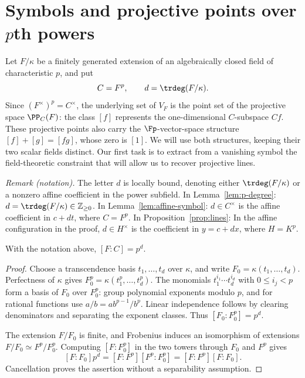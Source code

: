 \section{Symbols and projective points over \texorpdfstring{$p$}{p}th powers}
\label{sec:symbols}

Let $F/\kappa$ be a finitely generated extension of an algebraically closed
field of characteristic $p$, and put
\[
 C=F^p,\qquad d=\trdeg(F/\kappa).
\]
Since $(F^\times)^p=C^\times$, the underlying set of $V_F$ is the point set
of the projective space $\PP_C(F)$: the class $[f]$ represents the
one-dimensional $C$-subspace $Cf$.  These projective points also carry the
$\Fp$-vector-space structure $[f]+[g]=[fg]$, whose zero is $[1]$.
We will use both structures, keeping their two scalar fields distinct.
Our first task is to extract from a vanishing symbol the field-theoretic
constraint that will allow us to recover projective lines.

\noindent\textit{Remark (notation).} The letter $d$ is locally bound, denoting either $\trdeg(F/\kappa)$ or a nonzero affine coefficient in the power subfield. In Lemma~\ref{lem:p-degree}: $d=\trdeg(F/\kappa)\in\mathbb Z_{\ge0}$. In Lemma~\ref{lem:affine-symbol}: $d\in C^\times$ is the affine coefficient in $c+dt$, where $C=F^p$. In Proposition~\ref{prop:lines}: In the affine configuration in the proof, $d\in H^\times$ is the coefficient in $y=c+dx$, where $H=K^p$.


\begin{lemma}\label{lem:p-degree}
With the notation above, $[F:C]=p^d$.
\end{lemma}

\begin{proof}
Choose a transcendence basis $t_1,\ldots,t_d$ over $\kappa$, and write
$F_0=\kappa(t_1,\ldots,t_d)$.  Perfectness of $\kappa$ gives
$F_0^p=\kappa(t_1^p,\ldots,t_d^p)$.  The monomials
$t_1^{i_1}\cdots t_d^{i_d}$ with $0\leq i_j<p$ form a basis of $F_0$ over
$F_0^p$: group polynomial exponents modulo $p$, and for rational functions
use $a/b=ab^{p-1}/b^p$.  Linear independence follows by clearing
denominators and separating the exponent classes.
Thus $[F_0:F_0^p]=p^d$.

The extension $F/F_0$ is finite, and Frobenius induces an isomorphism of
extensions $F/F_0\simeq F^p/F_0^p$.  Computing $[F:F_0^p]$ in the two
towers through $F_0$ and $F^p$ gives
\[
 [F:F_0]p^d=[F:F^p][F^p:F_0^p]
           =[F:F^p][F:F_0].
\]
Cancellation proves the assertion without a separability assumption.
\end{proof}

